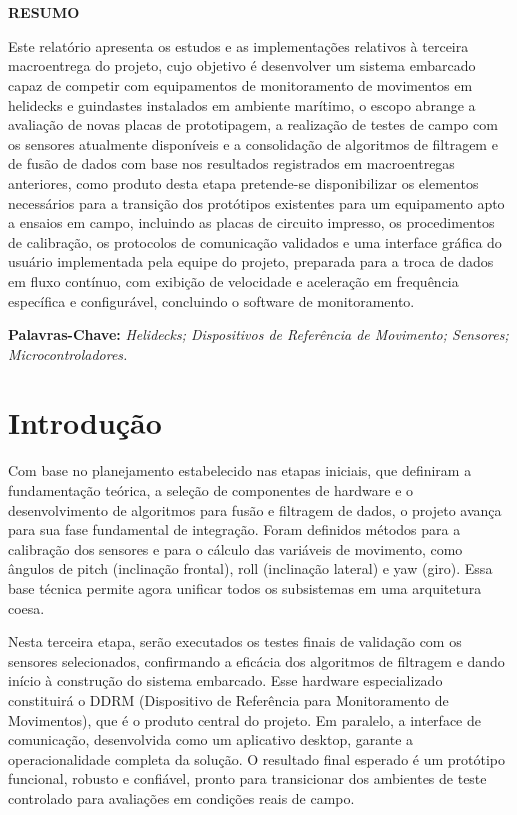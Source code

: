\documentclass[a4paper, 12pt]{article}
\makeatletter
\renewcommand\tableofcontents{%
    \centering
    \section*{\contentsname
        \@mkboth{%
           \MakeUppercase\contentsname}{\MakeUppercase\contentsname}}%
    \@starttoc{toc}%
    }
\makeatother
\begin{document}

\pagestyle{modeloTexto}


\newpage
\tableofcontents
\newpage
\listoffigures
\newpage
\listoftables
\newpage
\raggedright
\justifying
\normalsize


\newpage
\begin{center}
    \Large \textbf{RESUMO}
\end{center}

\noindent
Este relatório apresenta os estudos e as implementações relativos à terceira macroentrega do projeto, cujo objetivo é desenvolver um sistema embarcado capaz de competir com equipamentos de monitoramento de movimentos em helidecks e guindastes instalados em ambiente marítimo, o escopo abrange a avaliação de novas placas de prototipagem, a realização de testes de campo com os sensores atualmente disponíveis e a consolidação de algoritmos de filtragem e de fusão de dados com base nos resultados registrados em macroentregas anteriores, como produto desta etapa pretende-se disponibilizar os elementos necessários para a transição dos protótipos existentes para um equipamento apto a ensaios em campo, incluindo as placas de circuito impresso, os procedimentos de calibração, os protocolos de comunicação validados e uma interface gráfica do usuário implementada pela equipe do projeto, preparada para a troca de dados em fluxo contínuo, com exibição de velocidade e aceleração em frequência específica e configurável, concluindo o software de monitoramento.

\vspace{.15cm}
\noindent
\textbf{Palavras-Chave:} \textit{Helidecks; Dispositivos de Referência de Movimento; Sensores; Microcontroladores.}


\newpage
\section{Introdução}
    Com base no planejamento estabelecido nas etapas iniciais, que definiram a fundamentação teórica, a seleção de componentes de hardware e o desenvolvimento de algoritmos para fusão e filtragem de dados, o projeto avança para sua fase fundamental de integração. Foram definidos métodos para a calibração dos sensores e para o cálculo das variáveis de movimento, como ângulos de pitch (inclinação frontal), roll (inclinação lateral) e yaw (giro). Essa base técnica permite agora unificar todos os subsistemas em uma arquitetura coesa.

    Nesta terceira etapa, serão executados os testes finais de validação com os sensores selecionados, confirmando a eficácia dos algoritmos de filtragem e dando início à construção do sistema embarcado. Esse hardware especializado constituirá o DDRM (Dispositivo de Referência para Monitoramento de Movimentos), que é o produto central do projeto. Em paralelo, a interface de comunicação, desenvolvida como um aplicativo desktop, garante a operacionalidade completa da solução. O resultado final esperado é um protótipo funcional, robusto e confiável, pronto para transicionar dos ambientes de teste controlado para avaliações em condições reais de campo.
\end{document}
